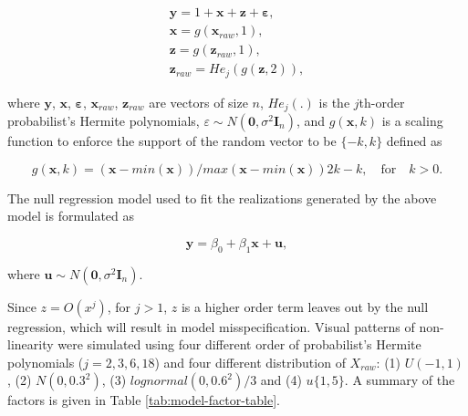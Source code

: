\documentclass[]{interact}
\theoremstyle{plain}%
\theoremstyle{definition}
\theoremstyle{remark}
\begin{document}
\begin{align} \label{eq:nonlinearity-model}
\boldsymbol{y} = 1 + \boldsymbol{x} + \boldsymbol{z} + \boldsymbol{\varepsilon},\\
\boldsymbol{x} = g(\boldsymbol{x}_{raw}, 1), \\
\boldsymbol{z} = g(\boldsymbol{z}_{raw}, 1), \\
\boldsymbol{z}_{raw} = He_j(g(\boldsymbol{z}, 2)),
\end{align}

\noindent where \(\boldsymbol{y}\), \(\boldsymbol{x}\),
\(\boldsymbol{\varepsilon}\), \(\boldsymbol{x}_{raw}\),
\(\boldsymbol{z}_{raw}\) are vectors of size \(n\), \(He_{j}(.)\) is the
\(j\)th-order probabilist's Hermite polynomials,
\(\varepsilon \sim N(\boldsymbol{0}, \sigma^2\boldsymbol{I}_n)\), and
\(g(\boldsymbol{x}, k)\) is a scaling function to enforce the support of
the random vector to be \(\{-k, k\}\) defined as

\begin{equation} \label{eq:scaling-function}
g(\boldsymbol{x}, k) = (\boldsymbol{x} - min(\boldsymbol{x}))/max(\boldsymbol{x} - min(\boldsymbol{x}))2k - k, \quad \text{for} \quad k > 0. 
\end{equation}

The null regression model used to fit the realizations generated by the
above model is formulated as

\begin{equation} \label{eq:null-model}
\boldsymbol{y} = \beta_0 + \beta_1 \boldsymbol{x} + \boldsymbol{u},
\end{equation}

\noindent where
\(\boldsymbol{u} \sim N(\boldsymbol{0}, \sigma^2\boldsymbol{I}_n)\).

Since \(z = O(x^j)\), for \(j > 1\), \(z\) is a higher order term leaves
out by the null regression, which will result in model misspecification.
Visual patterns of non-linearity were simulated using four different
order of probabilist's Hermite polynomials (\(j = 2, 3, 6, 18\)) and
four different distribution of \(X_{raw}\): (1) \(U(-1, 1)\), (2)
\(N(0, 0.3^2)\), (3) \(lognormal(0, 0.6^2)/3\) and (4) \(u\{1, 5\}\). A
summary of the factors is given in Table \ref{tab:model-factor-table}.
\end{document}
